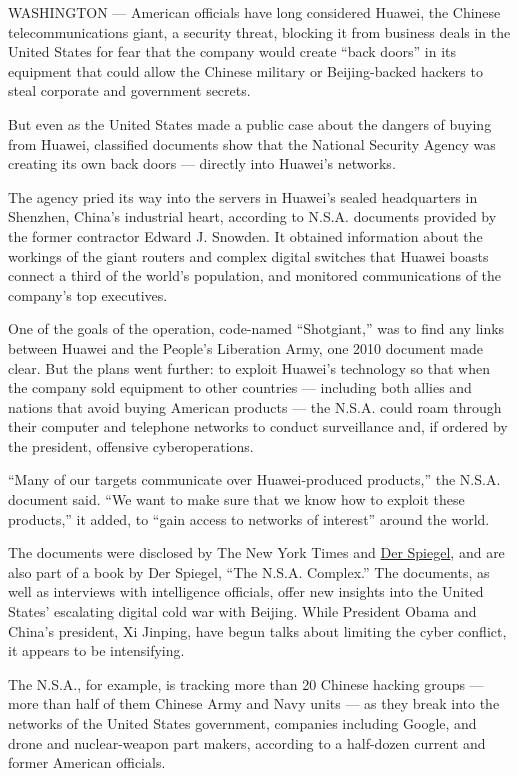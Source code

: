 WASHINGTON --- American officials have long considered Huawei, the
Chinese telecommunications giant, a security threat, blocking it from
business deals in the United States for fear that the company would
create ``back doors'' in its equipment that could allow the Chinese
military or Beijing-backed hackers to steal corporate and government
secrets.

But even as the United States made a public case about the dangers of
buying from Huawei, classified documents show that the National Security
Agency was creating its own back doors --- directly into Huawei's
networks.

The agency pried its way into the servers in Huawei's sealed
headquarters in Shenzhen, China's industrial heart, according to N.S.A.
documents provided by the former contractor Edward J. Snowden. It
obtained information about the workings of the giant routers and complex
digital switches that Huawei boasts connect a third of the world's
population, and monitored communications of the company's top
executives.

One of the goals of the operation, code-named ``Shotgiant,'' was to find
any links between Huawei and the People's Liberation Army, one 2010
document made clear. But the plans went further: to exploit Huawei's
technology so that when the company sold equipment to other countries
--- including both allies and nations that avoid buying American
products --- the N.S.A. could roam through their computer and telephone
networks to conduct surveillance and, if ordered by the president,
offensive cyberoperations.

``Many of our targets communicate over Huawei-produced products,'' the
N.S.A. document said. ``We want to make sure that we know how to exploit
these products,'' it added, to ``gain access to networks of interest''
around the world.

The documents were disclosed by The New York Times and
\href{http://www.spiegel.de/international/world/nsa-spied-on-chinese-government-and-networking-firm-huawei-a-960199.html}{Der
Spiegel}, and are also part of a book by Der Spiegel, ``The N.S.A.
Complex.'' The documents, as well as interviews with intelligence
officials, offer new insights into the United States' escalating digital
cold war with Beijing. While President Obama and China's president, Xi
Jinping, have begun talks about limiting the cyber conflict, it appears
to be intensifying.

The N.S.A., for example, is tracking more than 20 Chinese hacking groups
--- more than half of them Chinese Army and Navy units --- as they break
into the networks of the United States government, companies including
Google, and drone and nuclear-weapon part makers, according to a
half-dozen current and former American officials.

